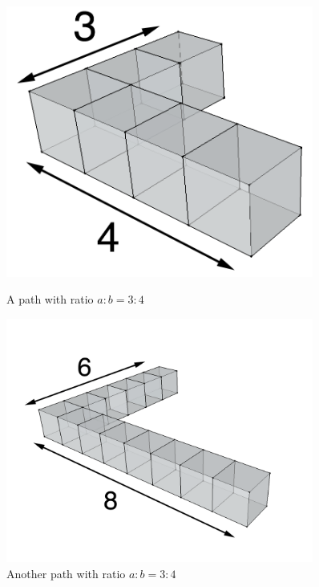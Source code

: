 \begin{figure}
\centering
  \begin{minipage}[t]{.45\textwidth}
  \centering
  \includegraphics[width=0.9\textwidth]{./figures/3by4}
    \caption{A path with ratio $a:b = 3:4$}
		\label{fig:3by4}
  \end{minipage}
  \begin{minipage}[t]{.45\textwidth}
  \centering
  \includegraphics[width=0.9\textwidth]{./figures/6by8}
    \caption{Another path with ratio $a:b = 3:4$}
    \label{fig:6by8}
  \end{minipage}\hfill
  \begin{minipage}[t]{.45\textwidth}
  \centering

\end{minipage}
\end{figure}
